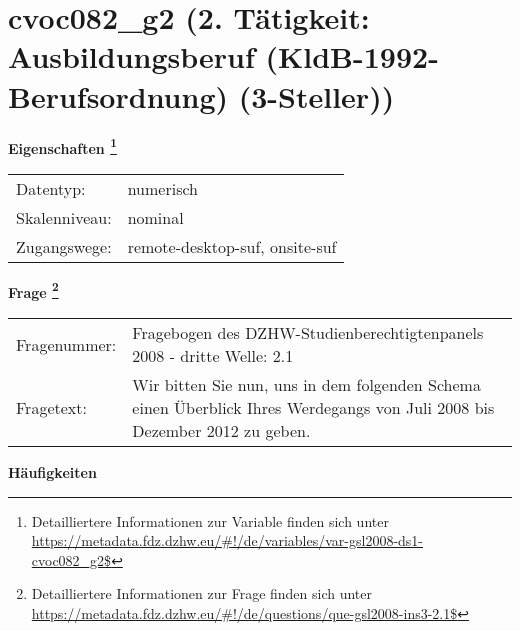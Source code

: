 
    \setcounter{footnote}{0}

    \vspace*{-1.8cm}
	\section{cvoc082\_g2 (2. Tätigkeit: Ausbildungsberuf (KldB-1992-Berufsordnung) (3-Steller))}
	\label{section:cvoc082_g2}



    \vspace*{0.5cm}
    \noindent\textbf{Eigenschaften
	\footnote{Detailliertere Informationen zur Variable finden sich unter
		\url{https://metadata.fdz.dzhw.eu/\#!/de/variables/var-gsl2008-ds1-cvoc082_g2$}}}\\
	\begin{tabularx}{\hsize}{@{}lX}
	Datentyp: & numerisch \\
	Skalenniveau: & nominal \\
	Zugangswege: &
	  remote-desktop-suf, 
	  onsite-suf
 \\
    \end{tabularx}



				\vspace*{0.5cm}
                \noindent\textbf{Frage
	                \footnote{Detailliertere Informationen zur Frage finden sich unter
		              \url{https://metadata.fdz.dzhw.eu/\#!/de/questions/que-gsl2008-ins3-2.1$}}}\\
				\begin{tabularx}{\hsize}{@{}lX}
					Fragenummer: &
					  Fragebogen des DZHW-Studienberechtigtenpanels 2008 - dritte Welle:
					  2.1
 \\
					Fragetext: & Wir bitten Sie nun, uns in dem folgenden Schema einen Überblick Ihres Werdegangs von Juli 2008 bis Dezember 2012 zu geben. \\
				\end{tabularx}





        		\vspace*{0.5cm}
                \noindent\textbf{Häufigkeiten}

